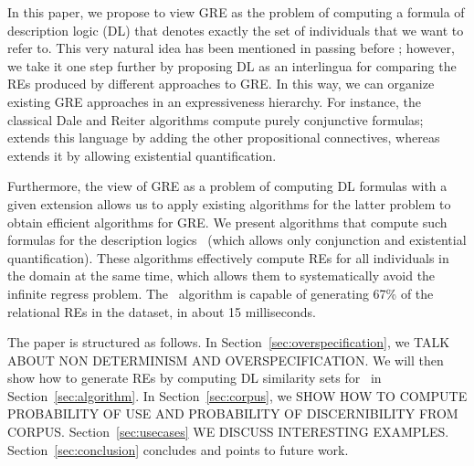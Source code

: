 In this paper, we propose to view GRE as the problem of computing a
formula of description logic (DL) that denotes exactly the set of
individuals that we want to refer to.  This very natural idea has been
mentioned in passing before
\cite{Krahmer2003,gardent07:_gener_bridg_defin_descr}; however, we
take it one step further by proposing DL as an interlingua for
comparing the REs produced by different approaches to GRE.  In this
way, we can organize existing GRE approaches in an expressiveness
hierarchy.  For instance, the classical Dale and Reiter algorithms
compute purely conjunctive formulas;
 extends this language by
adding the other propositional connectives, whereas
 extends it by
allowing existential quantification.

Furthermore, the view of GRE as a problem of computing DL formulas
with a given extension allows us to apply existing algorithms for the
latter problem to obtain efficient algorithms for GRE.  We present
algorithms that compute such formulas for the description logics \el\
(which allows only conjunction and existential quantification).  These algorithms effectively
compute REs for all individuals in the domain at the same time, which
allows them to systematically avoid the infinite regress problem.  The
\el\ algorithm is capable of generating 67\% of the relational REs in
the \newcite{viethen06:_algor_for_gener_refer_expres} dataset, in about
15 milliseconds.  


The paper is structured as follows.  In Section~\ref{sec:overspecification}, we
TALK ABOUT NON DETERMINISM AND OVERSPECIFICATION.  We will then show how to
generate REs by computing DL similarity sets for  \el\ in
Section~\ref{sec:algorithm}.  In Section~\ref{sec:corpus}, we SHOW HOW TO COMPUTE
PROBABILITY OF USE AND PROBABILITY OF DISCERNIBILITY FROM CORPUS.  Section~\ref{sec:usecases}
WE DISCUSS INTERESTING EXAMPLES. Section~\ref{sec:conclusion} concludes and points to future work.

